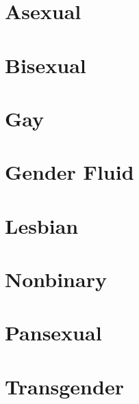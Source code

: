 
\section*{Asexual}


\section*{Bisexual}


\section*{Gay}


\section*{Gender Fluid}


\section*{Lesbian}


\section*{Nonbinary}


\section*{Pansexual}


\section*{Transgender}

